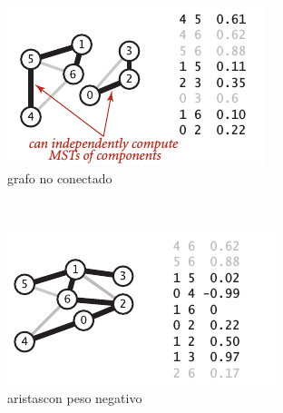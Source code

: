 \documentclass[letterpaper]{article}
\begin{document}
\begin{figure}[h]
        \centering
        \begin{subfigure}[b]{0.3\textwidth}
                \includegraphics[width=\textwidth]{Images/conve1.png}
                \caption{grafo no conectado}
                \label{fig:conve1}
        \end{subfigure}%
        ~ %
        \begin{subfigure}[b]{0.3\textwidth}
                \includegraphics[width=\textwidth]{Images/conve2.png}
                \caption{aristascon peso negativo}
                \label{fig:conve2}
        \end{subfigure}
        ~ %
        \begin{subfigure}[b]{0.3\textwidth}

\end{subfigure}
\end{figure}
\end{document}

